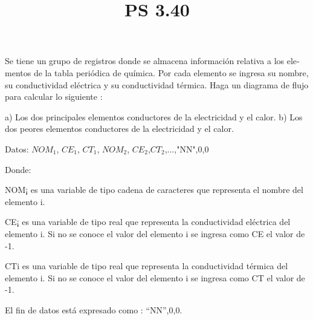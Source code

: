 \documentclass[11pt]{amsart}
\title{PS 3.40}
\begin{document}
\maketitle
\noindent Se tiene un grupo de registros donde se almacena información relativa a los ele­mentos de la tabla periódica de química. Por cada elemento se ingresa su nom­bre, su conductividad eléctrica y su conductividad térmica. Haga un diagrama de flujo para calcular lo siguiente :
\newline

\noindent a) Los dos principales elementos conductores de la electricidad y el calor.
\noindent b) Los dos peores elementos conductores de la electricidad y el calor.
\newline

\noindent Datos: $NOM_{1}$, $CE_{1}$, $CT_{1}$, $NOM_{2}$, $CE_{2}$,$CT_{2}$,...,"NN",0,0
\newline

\noindent Donde: 
\newline

\noindent NOM¡ es una variable de tipo cadena de caracteres que representa el nombre del elemento i.

\noindent CE¡ es una variable de tipo real que representa la conductividad eléc­trica del elemento i. Si no se conoce el valor del elemento i se in­gresa como CE el valor de -1.

\noindent CTi es una variable de tipo real que representa la conductividad térmi­ca del elemento i. Si no se conoce el valor del elemento i se ingresa como CT el valor de -1.
\newline

\noindent El fin de datos está expresado como : “NN”,0,0.
\end{document}
